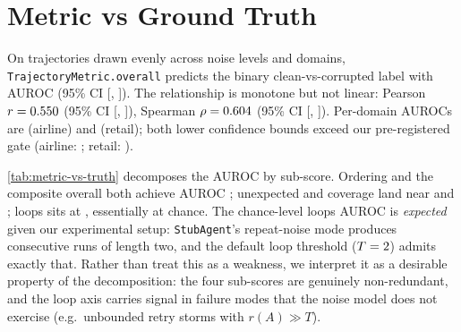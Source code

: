 \documentclass{article}
\begin{document}
\begin{table}[t]
  \centering
  \caption{Mean overall score by noise level, both domains
  (\NoiseSeedsCount{} seeds $\times$ \NoiseLevelsCount{} levels per
  domain). Monotonicity holds end-to-end.}
  \label{tab:noise-monotonicity}
  \TableNoiseMonotonicity
\end{table}

\section{Metric vs Ground Truth}
\label{sec:metric-vs-truth}

On \NTrajectories{} trajectories drawn evenly across noise levels and
domains, \texttt{TrajectoryMetric.overall} predicts the binary
clean-vs-corrupted label with AUROC \AurocOverall{} (95\% CI
[\AurocOverallCiLow{}, \AurocOverallCiHigh{}]). The relationship is
monotone but not linear: Pearson $r=0.550{}$ (95\% CI
[\PearsonOverallCiLow{}, \PearsonOverallCiHigh{}]),
Spearman $\rho=0.604{}$ (95\% CI [\SpearmanOverallCiLow{},
\SpearmanOverallCiHigh{}]). Per-domain AUROCs are
\AurocAirline{} (airline) and \AurocRetail{} (retail); both lower
confidence bounds exceed our pre-registered \AurocGateLowerBound{}
gate (airline: \AurocGatePassedAirline{}; retail:
\AurocGatePassedRetail{}).

\autoref{tab:metric-vs-truth} decomposes the AUROC by sub-score.
Ordering and the composite overall both achieve AUROC \AurocOrdering{};
unexpected and coverage land near \AurocUnexpected{} and
\AurocCoverage{}; loops sits at \AurocLoops{}, essentially at chance.
The chance-level loops AUROC is \emph{expected} given our experimental
setup: \texttt{StubAgent}'s repeat-noise mode produces consecutive
runs of length two, and the default loop threshold
($T=2{}$) admits exactly that. Rather than treat
this as a weakness, we interpret it as a desirable property of the
decomposition: the four sub-scores are genuinely non-redundant, and
the loop axis carries signal in failure modes that the noise model
does not exercise (e.g.~unbounded retry storms with $r(A) \gg T$).

\begin{table}[t]
  \centering
  \caption{AUROC, Pearson $r$, and Spearman $\rho$ between each
  trajectory sub-score and binary task success. CIs are 95\%
  percentile bootstraps with $B=\NBootstrap{}$. The four sub-scores
  carry distinct signal.}
  \label{tab:metric-vs-truth}
  \TableMetricVsTruth
\end{table}
\end{document}
